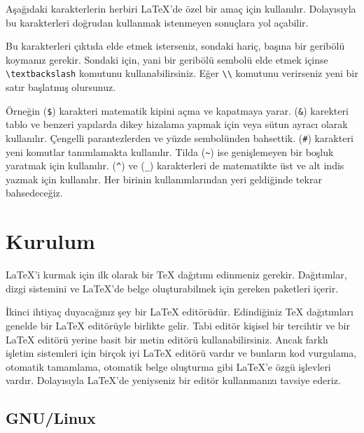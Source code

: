 \documentclass[
  letterpaper,
  DIV=11,
  numbers=noendperiod]{scrreprt}
\newenvironment{Shaded}{\begin{snugshade}}{\end{snugshade}}
\newcommand{\CommentTok}[1]{\textcolor[rgb]{0.37,0.37,0.37}{#1}}
\newcommand{\NormalTok}[1]{\textcolor[rgb]{0.00,0.23,0.31}{#1}}
\newcommand{\SpecialStringTok}[1]{\textcolor[rgb]{0.13,0.47,0.30}{#1}}
\begin{document}
Aşağıdaki karakterlerin herbiri {\LaTeX}'de özel bir amaç için
kullanılır. Dolayısıyla bu karakterleri doğrudan kullanmak istenmeyen
sonuçlara yol açabilir.

\begin{Shaded}
\begin{Highlighting}[]
\NormalTok{\# }\SpecialStringTok{$ }\CommentTok{\%   \&   \{   \}   \textasciitilde{}  \^{}  \_ \textbackslash{}}
\end{Highlighting}
\end{Shaded}

Bu karakterleri çıktıda elde etmek isterseniz, sondaki hariç, başına bir
geribölü koymanız gerekir. Sondaki için, yani bir geribölü sembolü elde
etmek içinse \texttt{\textbackslash{}textbackslash} komutunu
kullanabilirsiniz. Eğer \texttt{\textbackslash{}\textbackslash{}}
komutunu verirseniz yeni bir satır başlatmış olursunuz.

Örneğin (\texttt{\$}) karakteri matematik kipini açma ve kapatmaya
yarar. (\texttt{\&}) karekteri tablo ve benzeri yapılarda dikey hizalama
yapmak için veya sütun ayracı olarak kullanılır. Çengelli parantezlerden
ve yüzde sembolünden bahsettik. (\texttt{\#}) karakteri yeni komutlar
tanımlamakta kullanılır. Tilda (\texttt{\textasciitilde{}}) ise
genişlemeyen bir boşluk yaratmak için kullanılır. (\texttt{\^{}}) ve
(\texttt{\_}) karakterleri de matematikte üst ve alt indis yazmak için
kullanılır. Her birinin kullanımlarından yeri geldiğinde tekrar
bahsedeceğiz.

\hypertarget{kurulum}{%
\section{Kurulum}\label{kurulum}}

{\LaTeX}'i kurmak için ilk olarak bir {\TeX} dağıtımı edinmeniz gerekir.
Dağıtımlar, dizgi sistemini ve {\LaTeX}'de belge oluşturabilmek için
gereken paketleri içerir.

İkinci ihtiyaç duyacağınız şey bir {\LaTeX} editörüdür. Edindiğiniz
{\TeX} dağıtımları genelde bir {\LaTeX} editörüyle birlikte gelir. Tabi
editör kişisel bir tercihtir ve bir {\LaTeX} editörü yerine basit bir
metin editörü kullanabilirsiniz. Ancak farklı işletim sistemleri için
birçok iyi {\LaTeX} editörü vardır ve bunların kod vurgulama, otomatik
tamamlama, otomatik belge oluşturma gibi {\LaTeX}'e özgü işlevleri
vardır. Dolayısıyla {\LaTeX}'de yeniyseniz bir editör kullanmanızı
tavsiye ederiz.

\hypertarget{gnulinux}{%
\subsection{GNU/Linux}\label{gnulinux}}
\end{document}
